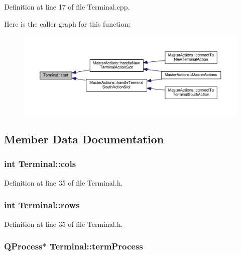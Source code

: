 Definition at line 17 of file Terminal.\-cpp.



Here is the caller graph for this function\-:
\nopagebreak
\begin{figure}[H]
\begin{center}
\leavevmode
\includegraphics[width=350pt]{class_terminal_aab08ef06e15138f44838f2f643cdb70e_icgraph}
\end{center}
\end{figure}




\subsection{Member Data Documentation}
\hypertarget{class_terminal_a7d56233a2d7c1c4ecdba979a73287b68}{
\subsubsection[{cols}]{\setlength{\rightskip}{0pt plus 5cm}int Terminal\-::cols\hspace{0.3cm}{\ttfamily [private]}}}\label{class_terminal_a7d56233a2d7c1c4ecdba979a73287b68}


Definition at line 35 of file Terminal.\-h.

\hypertarget{class_terminal_a313f2303fb304b5c317cbda44b861a54}{
\subsubsection[{rows}]{\setlength{\rightskip}{0pt plus 5cm}int Terminal\-::rows\hspace{0.3cm}{\ttfamily [private]}}}\label{class_terminal_a313f2303fb304b5c317cbda44b861a54}


Definition at line 35 of file Terminal.\-h.

\hypertarget{class_terminal_a7b62ba5151a7e984fa76ba2e67758bb0}{
\subsubsection[{term\-Process}]{\setlength{\rightskip}{0pt plus 5cm}Q\-Process$\ast$ Terminal\-::term\-Process\hspace{0.3cm}{\ttfamily [private]}}}\label{class_terminal_a7b62ba5151a7e984fa76ba2e67758bb0}


